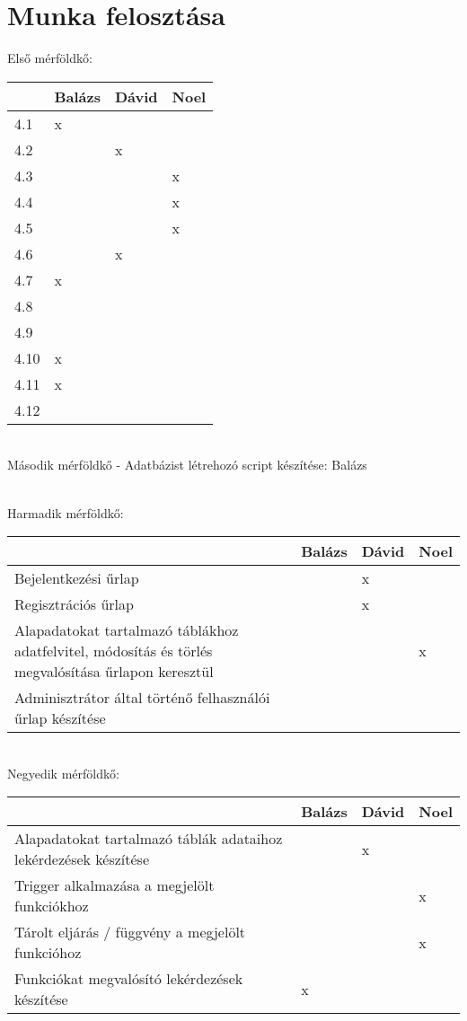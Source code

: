 \section{Munka felosztása}\label{sec:munka-felosztasa}

Első mérföldkő:


\begin{tabular}{ |p{3cm}|p{3cm}|p{3cm}|p{3cm}|  }
    \hline
    &Balázs & Dávid & Noel \\
    \hline
    4.1&x&& \\
    \hline
    4.2&&x& \\
    \hline
    4.3&&&x \\
    \hline
    4.4&&&x \\
    \hline
    4.5&&&x \\
    \hline
    4.6&&x& \\
    \hline
    4.7&x&& \\
    \hline
    4.8&&& \\
    \hline
    4.9&&& \\
    \hline
    4.10&x&& \\
    \hline
    4.11&x&& \\
    \hline
    4.12&&& \\
    \hline
\end{tabular}

\\
Második mérföldkő - Adatbázist létrehozó script készítése: Balázs

\\
Harmadik mérföldkő:


\begin{tabular}{ |p{3cm}|p{3cm}|p{3cm}|p{3cm}|  }
    \hline
    &Balázs & Dávid & Noel \\
    \hline
    Bejelentkezési űrlap&&x& \\
    \hline
    Regisztrációs űrlap&&x& \\
    \hline
    Alapadatokat tartalmazó táblákhoz adatfelvitel, módosítás és törlés megvalósítása űrlapon
keresztül&&&x \\
    \hline
    Adminisztrátor által történő felhasználói űrlap készítése&&&& \\
    \hline
\end{tabular}

\\
Negyedik mérföldkő:


\begin{tabular}{ |p{3cm}|p{3cm}|p{3cm}|p{3cm}|  }
    \hline
    &Balázs & Dávid & Noel \\
    \hline
    Alapadatokat tartalmazó táblák adataihoz lekérdezések készítése&&x& \\
    \hline
    Trigger alkalmazása a megjelölt funkciókhoz&&&x \\
    \hline
    Tárolt eljárás / függvény a megjelölt funkcióhoz&&&x \\
    \hline
    Funkciókat megvalósító lekérdezések készítése&x&& \\
    \hline
\end{tabular}

